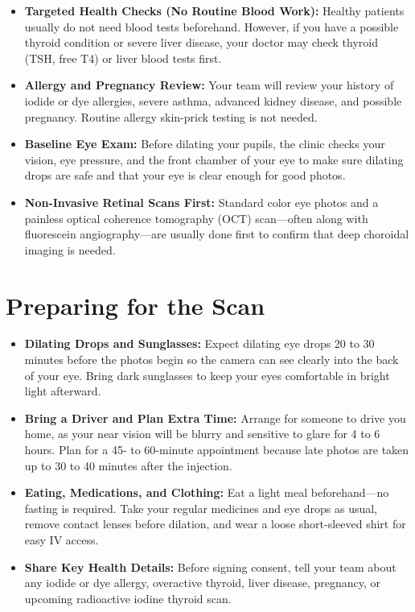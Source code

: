 \begin{itemize}
    \item \textbf{Targeted Health Checks (No Routine Blood Work):} Healthy patients usually do not need blood tests beforehand. However, if you have a possible thyroid condition or severe liver disease, your doctor may check thyroid (TSH, free T4) or liver blood tests first.
    \item \textbf{Allergy and Pregnancy Review:} Your team will review your history of iodide or dye allergies, severe asthma, advanced kidney disease, and possible pregnancy. Routine allergy skin-prick testing is not needed.
    \item \textbf{Baseline Eye Exam:} Before dilating your pupils, the clinic checks your vision, eye pressure, and the front chamber of your eye to make sure dilating drops are safe and that your eye is clear enough for good photos.
    \item \textbf{Non-Invasive Retinal Scans First:} Standard color eye photos and a painless optical coherence tomography (OCT) scan---often along with fluorescein angiography---are usually done first to confirm that deep choroidal imaging is needed.
\end{itemize}

\section{Preparing for the Scan}

\begin{itemize}
    \item \textbf{Dilating Drops and Sunglasses:} Expect dilating eye drops 20 to 30 minutes before the photos begin so the camera can see clearly into the back of your eye. Bring dark sunglasses to keep your eyes comfortable in bright light afterward.
    \item \textbf{Bring a Driver and Plan Extra Time:} Arrange for someone to drive you home, as your near vision will be blurry and sensitive to glare for 4 to 6 hours. Plan for a 45- to 60-minute appointment because late photos are taken up to 30 to 40 minutes after the injection.
    \item \textbf{Eating, Medications, and Clothing:} Eat a light meal beforehand---no fasting is required. Take your regular medicines and eye drops as usual, remove contact lenses before dilation, and wear a loose short-sleeved shirt for easy IV access.
    \item \textbf{Share Key Health Details:} Before signing consent, tell your team about any iodide or dye allergy, overactive thyroid, liver disease, pregnancy, or upcoming radioactive iodine thyroid scan.
\end{itemize}

